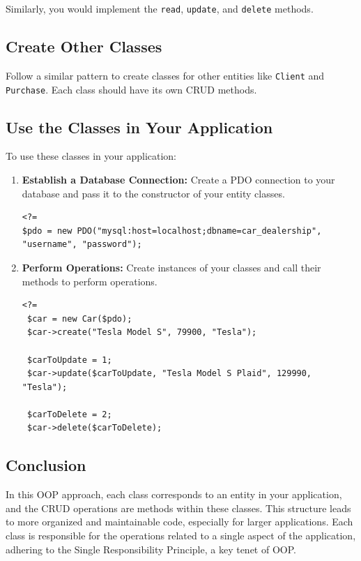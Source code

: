 \documentclass[11pt]{article}
\begin{document}
Similarly, you would implement the \texttt{read}, \texttt{update}, and \texttt{delete}
methods.

\subsection{Create Other Classes}
\label{sec:org81caa48}
Follow a similar pattern to create classes for other entities like
\texttt{Client} and \texttt{Purchase}. Each class should have its own CRUD methods.

\subsection{Use the Classes in Your Application}
\label{sec:org3b71729}
To use these classes in your application:

\begin{enumerate}
\item \textbf{Establish a Database Connection:} Create a PDO connection to your
database and pass it to the constructor of your entity classes.

\begin{verbatim}
<?=
$pdo = new PDO("mysql:host=localhost;dbname=car_dealership", "username", "password");
\end{verbatim}

\item \textbf{Perform Operations:} Create instances of your classes and call their
methods to perform operations.

\begin{verbatim}
<?=
 $car = new Car($pdo);
 $car->create("Tesla Model S", 79900, "Tesla");

 $carToUpdate = 1;
 $car->update($carToUpdate, "Tesla Model S Plaid", 129990, "Tesla");

 $carToDelete = 2;
 $car->delete($carToDelete);
\end{verbatim}
\end{enumerate}

\subsection{Conclusion}
\label{sec:orgf0dda97}
In this OOP approach, each class corresponds to an entity in your
application, and the CRUD operations are methods within these classes.
This structure leads to more organized and maintainable code, especially
for larger applications. Each class is responsible for the operations
related to a single aspect of the application, adhering to the Single
Responsibility Principle, a key tenet of OOP.
\end{document}
